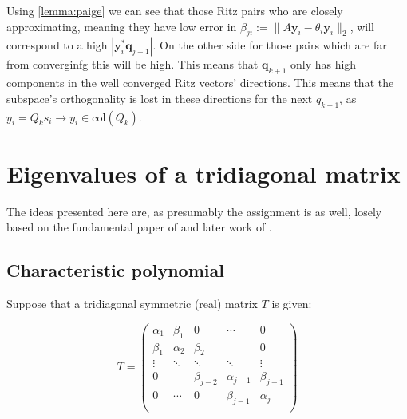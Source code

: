 \documentclass{article}
\begin{document}
Using \autoref{lemma:paige} we can see that those Ritz pairs who are closely approximating, meaning they have low error in $\beta_{ji} := \|A\textbf{y}_i - \theta_i \textbf{y}_i\|_2$, will correspond to a high $\left|\textbf{y}_i^{\ast}\textbf{q}_{j+1}\right|$. On the other side for those pairs which are far from converginfg this will be high. This means that $\textbf{q}_{k+1}$ only has high components in the well converged Ritz vectors' directions. This means that the subspace's orthogonality is lost in these directions for the next $q_{k+1}$, as $y_i = Q_k s_i \rightarrow y_i \in \mathrm{col}\left(Q_k\right)$.

\section{Eigenvalues of a tridiagonal matrix}\label{sec:eig-tri}
The ideas presented here are, as presumably the assignment is as well, losely based on the fundamental paper of \textcite{givens-eig} and later work of \textcite{sturm-ortega1960}.
\subsection{Characteristic polynomial}
Suppose that a tridiagonal symmetric (real) matrix $T$ is given:

$$T=\begin{pmatrix}
	\alpha_1&\beta_1&0&\cdots&0\\
	\beta_1&\alpha_2&\beta_2&&0\\
	\vdots&\ddots&\ddots&\ddots&\vdots\\
	0&&\beta_{j-2}&\alpha_{j-1}&\beta_{j-1}\\
	0&\cdots&0&\beta_{j-1}&\alpha_{j}\\
\end{pmatrix}$$
\end{document}
